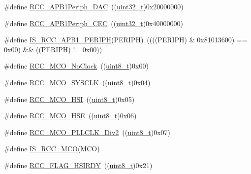 \begin{DoxyCompactItemize}
\item 
\#define \hyperlink{group___a_p_b1__peripheral_ga8d019a727701634822c19371b6aaabb5}{R\+C\+C\+\_\+\+A\+P\+B1\+Periph\+\_\+\+D\+AC}~((\hyperlink{_p_e___types_8h_a33594304e786b158f3fb30289278f5af}{uint32\+\_\+t})0x20000000)
\item 
\#define \hyperlink{group___a_p_b1__peripheral_gaa96437b649e13586945f40dac318a0ae}{R\+C\+C\+\_\+\+A\+P\+B1\+Periph\+\_\+\+C\+EC}~((\hyperlink{_p_e___types_8h_a33594304e786b158f3fb30289278f5af}{uint32\+\_\+t})0x40000000)
\item 
\#define \hyperlink{group___a_p_b1__peripheral_gab68e85308494436c4c55a69c42a79f36}{I\+S\+\_\+\+R\+C\+C\+\_\+\+A\+P\+B1\+\_\+\+P\+E\+R\+I\+PH}(P\+E\+R\+I\+PH)~((((P\+E\+R\+I\+PH) \& 0x81013600) == 0x00) \&\& ((\+P\+E\+R\+I\+P\+H) != 0x00))
\item 
\#define \hyperlink{group___clock__source__to__output__on___m_c_o__pin_ga1f39ff9f5606d3ad56e221d253be17d3}{R\+C\+C\+\_\+\+M\+C\+O\+\_\+\+No\+Clock}~((\hyperlink{_p_e___types_8h_aba7bc1797add20fe3efdf37ced1182c5}{uint8\+\_\+t})0x00)
\item 
\#define \hyperlink{group___clock__source__to__output__on___m_c_o__pin_gab766ad89492ffe915de3438aaa96891b}{R\+C\+C\+\_\+\+M\+C\+O\+\_\+\+S\+Y\+S\+C\+LK}~((\hyperlink{_p_e___types_8h_aba7bc1797add20fe3efdf37ced1182c5}{uint8\+\_\+t})0x04)
\item 
\#define \hyperlink{group___clock__source__to__output__on___m_c_o__pin_ga7206cdf03826781dc4fb1b094475d744}{R\+C\+C\+\_\+\+M\+C\+O\+\_\+\+H\+SI}~((\hyperlink{_p_e___types_8h_aba7bc1797add20fe3efdf37ced1182c5}{uint8\+\_\+t})0x05)
\item 
\#define \hyperlink{group___clock__source__to__output__on___m_c_o__pin_ga8bd64bbefd2a725a0cfe2f2902dd9b0f}{R\+C\+C\+\_\+\+M\+C\+O\+\_\+\+H\+SE}~((\hyperlink{_p_e___types_8h_aba7bc1797add20fe3efdf37ced1182c5}{uint8\+\_\+t})0x06)
\item 
\#define \hyperlink{group___clock__source__to__output__on___m_c_o__pin_ga1ce4233675bd7bdcb0220ed10ee7d8be}{R\+C\+C\+\_\+\+M\+C\+O\+\_\+\+P\+L\+L\+C\+L\+K\+\_\+\+Div2}~((\hyperlink{_p_e___types_8h_aba7bc1797add20fe3efdf37ced1182c5}{uint8\+\_\+t})0x07)
\item 
\#define \hyperlink{group___clock__source__to__output__on___m_c_o__pin_ga0c2d4d6aa8881e01b8c06d8816284b73}{I\+S\+\_\+\+R\+C\+C\+\_\+\+M\+CO}(M\+CO)
\item 
\#define \hyperlink{group___r_c_c___flag_ga827d986723e7ce652fa733bb8184d216}{R\+C\+C\+\_\+\+F\+L\+A\+G\+\_\+\+H\+S\+I\+R\+DY}~((\hyperlink{_p_e___types_8h_aba7bc1797add20fe3efdf37ced1182c5}{uint8\+\_\+t})0x21)

\end{DoxyCompactItemize}
